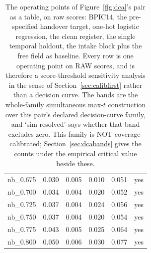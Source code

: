 \begin{table}[t]
{\begin{tabular}{lrrrrl}
nb\_0.675 & 0.030 & 0.005 & 0.010 & 0.051 & yes \\
nb\_0.700 & 0.034 & 0.004 & 0.020 & 0.052 & yes \\
nb\_0.725 & 0.037 & 0.004 & 0.024 & 0.056 & yes \\
nb\_0.750 & 0.037 & 0.004 & 0.020 & 0.054 & yes \\
nb\_0.775 & 0.043 & 0.005 & 0.025 & 0.064 & yes \\
nb\_0.800 & 0.050 & 0.006 & 0.030 & 0.077 & yes \\
\bottomrule
\end{tabular}%
}
\caption{The operating points of Figure~\ref{fig:dca}'s pair as a table, on raw scores: BPIC14, the pre-specified handover target, one-hot logistic regression, the clean register, the single temporal holdout, the intake block plus the free field as baseline. Every row is one operating point on RAW scores, and is therefore a score-threshold sensitivity analysis in the sense of Section~\ref{sec:calibfirst} rather than a decision curve. The bands are the whole-family simultaneous max-$t$ construction over this pair's declared decision-curve family, and `sim resolved' says whether that band excludes zero. This family is NOT coverage-calibrated; Section~\ref{sec:dcabands} gives the counts under the empirical critical value beside these.}
\label{tab:dca}
\end{table}

